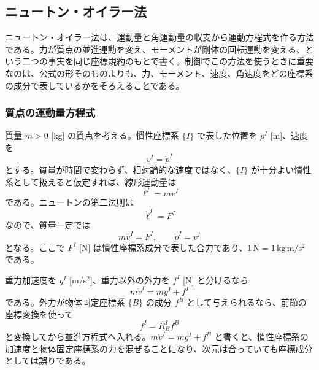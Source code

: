 \subsection{ニュートン・オイラー法}

ニュートン・オイラー法は、運動量と角運動量の収支から運動方程式を作る方法である。力が質点の並進運動を変え、モーメントが剛体の回転運動を変える、という二つの事実を同じ座標規約のもとで書く。制御でこの方法を使うときに重要なのは、公式の形そのものよりも、力、モーメント、速度、角速度をどの座標系の成分で表しているかをそろえることである。

\subsubsection{質点の運動量方程式}

質量 $m>0$ [kg] の質点を考える。慣性座標系 $\{I\}$ で表した位置を $p^I$ [m]、速度を
\begin{equation}
  v^I=\dot{p}^I
\end{equation}
とする。質量が時間で変わらず、相対論的な速度ではなく、$\{I\}$ が十分よい慣性系として扱えると仮定すれば、線形運動量は
\begin{equation}
  \ell^I=mv^I
\end{equation}
である。ニュートンの第二法則は
\begin{equation}
  \dot{\ell}^I=F^I
\end{equation}
なので、質量一定では
\begin{equation}
  m\dot{v}^I=F^I,\qquad
  \dot{p}^I=v^I
\end{equation}
となる。ここで $F^I$ [N] は慣性座標系成分で表した合力であり、$1\,\mathrm{N}=1\,\mathrm{kg\,m/s^2}$ である。

重力加速度を $g^I$ [m/s$^2$]、重力以外の外力を $f^I$ [N] と分けるなら
\begin{equation}
  m\dot{v}^I=mg^I+f^I
\end{equation}
である。外力が物体固定座標系 $\{B\}$ の成分 $f^B$ として与えられるなら、前節の座標変換を使って
\begin{equation}
  f^I=R^I_B f^B
\end{equation}
と変換してから並進方程式へ入れる。$m\dot{v}^I=mg^I+f^B$ と書くと、慣性座標系の加速度と物体固定座標系の力を混ぜることになり、次元は合っていても座標成分としては誤りである。

